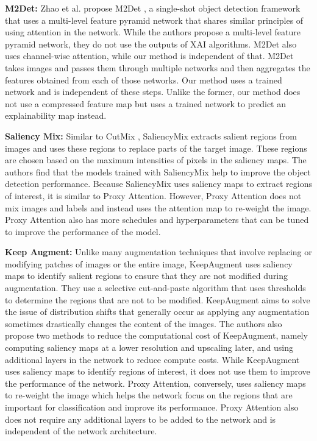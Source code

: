\textbf{M2Det: }
Zhao et al. propose M2Det \cite{zhaoM2DetSingleShotObject2019}, a single-shot object detection framework that uses a multi-level feature pyramid network that shares similar principles of using attention in the network. While the authors propose a multi-level feature pyramid network, they do not use the outputs of XAI algorithms. M2Det also uses channel-wise attention, while our method is independent of that. M2Det takes images and passes them through multiple networks and then aggregates the features obtained from each of those networks. Our method uses a trained network and is independent of these steps. Unlike the former, our method does not use a compressed feature map but uses a trained network to predict an explainability map instead.

\textbf{Saliency Mix: }
Similar to CutMix \cite{yunCutMixRegularizationStrategy2019}, SaliencyMix \cite{uddinSaliencyMixSaliencyGuided2021} extracts salient regions from images and uses these regions to replace parts of the target image. These regions are chosen based on the maximum intensities of pixels in the saliency maps. The authors find that the models trained with SaliencyMix help to improve the object detection performance. Because SaliencyMix uses saliency maps to extract regions of interest, it is similar to Proxy Attention. However, Proxy Attention does not mix images and labels and instead uses the attention map to re-weight the image. Proxy Attention also has more schedules and hyperparameters that can be tuned to improve the performance of the model.

\textbf{Keep Augment: }
Unlike many augmentation techniques that involve replacing or modifying patches of images or the entire image, KeepAugment \cite{gongKeepAugmentSimpleInformationPreserving2021} uses saliency maps to identify salient regions to ensure that they are not modified during augmentation. They use a selective cut-and-paste algorithm that uses thresholds to determine the regions that are not to be modified. KeepAugment aims to solve the issue of distribution shifts that generally occur as applying any augmentation sometimes drastically changes the content of the images. The authors also propose two methods to reduce the computational cost of KeepAugment, namely computing saliency maps at a lower resolution and upscaling later, and using additional layers in the network to reduce compute costs. While KeepAugment uses saliency maps to identify regions of interest, it does not use them to improve the performance of the network. Proxy Attention, conversely, uses saliency maps to re-weight the image which helps the network focus on the regions that are important for classification and improve its performance. Proxy Attention also does not require any additional layers to be added to the network and is independent of the network architecture.

